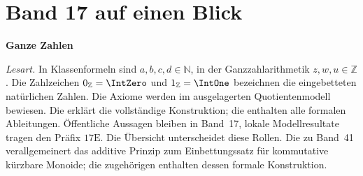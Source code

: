 \chapter[Band 17: Ganze Zahlen]{Band 17 auf einen Blick}
\noindent\textbf{Ganze Zahlen}\par\medskip
\noindent\emph{Lesart.}
In Klassenformeln sind \(a,b,c,d\in\mathbb N\), in der Ganzzahlarithmetik
\(z,w,u\in\mathbb Z\). Die Zahlzeichen \(0_{\mathbb Z}=\IntZero\) und
\(1_{\mathbb Z}=\IntOne\) bezeichnen die eingebetteten natürlichen Zahlen.
Die Axiome werden im ausgelagerten Quotientenmodell bewiesen.
Die \IntegersReadingLink{} erklärt die vollständige Konstruktion;
die \IntegersProofsLink{} enthalten alle formalen Ableitungen.
Öffentliche Aussagen bleiben in Band~17, lokale Modellresultate tragen
den Präfix \(17\mathrm E\). Die Übersicht unterscheidet diese Rollen.
Die \DifferencesReadingLink{} zu Band~41 verallgemeinert das additive
Prinzip zum Einbettungssatz für kommutative kürzbare Monoide;
die zugehörigen \DifferencesProofsLink{} enthalten dessen formale Konstruktion.

